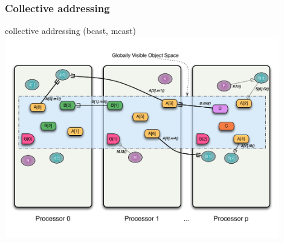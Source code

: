 \begin{frame}
\frametitle{Collective addressing}
	\begin{center}
        collective addressing (bcast, mcast)
        \includegraphics[width=0.9\textwidth]{../figures/progmodel/11-global-methods.pdf}
	\end{center}
\end{frame}



